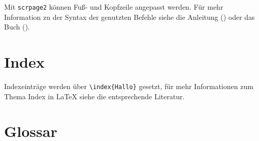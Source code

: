 Mit \texttt{scrpage2} können Fuß- und Kopfzeile angepasst werden. Für mehr Information zu der Syntax der genutzten Befehle siehe die Anleitung (\cite{koma}) oder das Buch (\cite{komabuch}).

\section{Index} 

Indexeinträge werden über \verb|\index{Hallo}| gesetzt, für mehr Informationen zum Thema Index in \LaTeX\xspace siehe die entsprechende Literatur. 

\section{Glossar}\label{intro:gloss}

